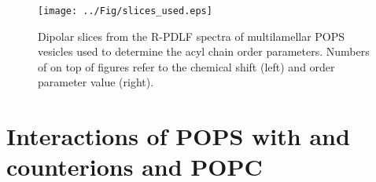 \documentclass[journal=jctcce,manuscript=article]{achemso}
\begin{document}
\begin{figure}[hbp!] 
  \centering 
  \texttt{[image: ../Fig/slices\_used.eps]}
  \caption{\label{R-PDLFslices}
    Dipolar slices from the R-PDLF spectra of multilamellar POPS vesicles used to determine the acyl chain order parameters.
    Numbers of on top of figures refer to the chemical shift (left) and order parameter value (right).
  }
\end{figure} 


%
%


\pagebreak
\section{Interactions of POPS with  and  counterions and POPC}
\end{document}
